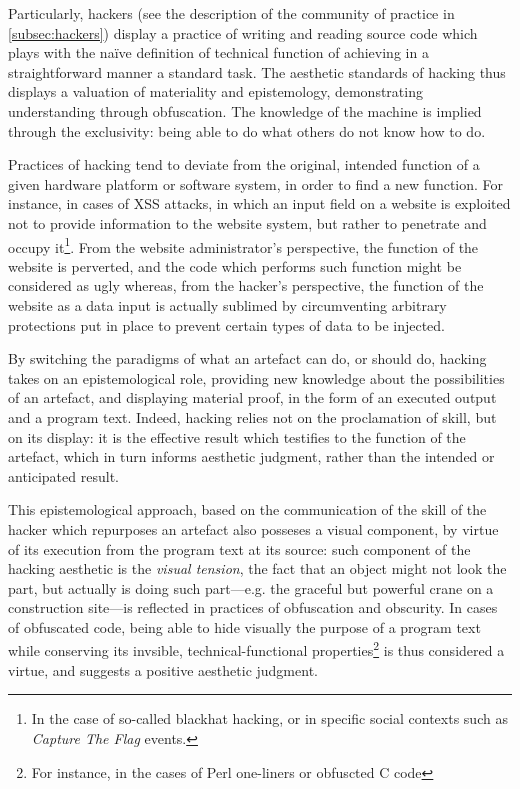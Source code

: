 Particularly, hackers (see the description of the community of practice in \ref{subsec:hackers}) display a practice of writing and reading source code which plays with the naïve definition of technical function of achieving in a straightforward manner a standard task. The aesthetic standards of hacking thus displays a valuation of materiality and epistemology, demonstrating understanding through obfuscation. The knowledge of the machine is implied through the exclusivity: being able to do what others do not know how to do.

Practices of hacking tend to deviate from the original, intended function of a given hardware platform or software system, in order to find a new function. For instance, in cases of XSS attacks, in which an input field on a website is exploited not to provide information to the website system, but rather to penetrate and occupy it\footnote{In the case of so-called blackhat hacking, or in specific social contexts such as \emph{Capture The Flag} events.}. From the website administrator's perspective, the function of the website is perverted, and the code which performs such function might be considered as ugly whereas, from the hacker's perspective, the function of the website as a data input is actually sublimed by circumventing arbitrary protections put in place to prevent certain types of data to be injected.

By switching the paradigms of what an artefact can do, or should do, hacking takes on an epistemological role, providing new knowledge about the possibilities of an artefact, and displaying material proof, in the form of an executed output and a program text. Indeed, hacking relies not on the proclamation of skill, but on its display: it is the effective result which testifies to the function of the artefact, which in turn informs aesthetic judgment, rather than the intended or anticipated result.

This epistemological approach, based on the communication of the skill of the hacker which repurposes an artefact also posseses a visual component, by virtue of its execution from the program text at its source: such component of the hacking aesthetic is the \emph{visual tension}, the fact that an object might not look the part, but actually is doing such part—e.g. the graceful but powerful crane on a construction site—is reflected in practices of obfuscation and obscurity. In cases of obfuscated code, being able to hide visually the purpose of a program text while conserving its invsible, technical-functional properties\footnote{For instance, in the cases of Perl one-liners or obfuscted C code} is thus considered a virtue, and suggests a positive aesthetic judgment. 

